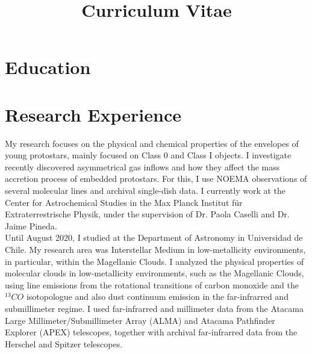 \documentclass[11pt,a4paper,verdana]{moderncv} %
\title{Curriculum Vitae}
\begin{document}
\makecvtitle %

\section{Education}

\section{Research Experience}

My research focuses on the physical and chemical properties of the envelopes of young protostars, mainly focused on Class 0 and Class I objects. I investigate recently discovered asymmetrical gas inflows and how they affect the mass accretion process of embedded protostars. For this, I use NOEMA observations of several molecular lines and archival single-dish data. I currently work at the Center for Astrochemical Studies in the Max Planck Institut f\"{u}r Extraterrestrische Physik, under the supervision of Dr. Paola Caselli and Dr. Jaime Pineda. 
\\
Until August 2020, I studied at the Department of Astronomy in Universidad de Chile. My research area was Interstellar Medium in low-metallicity environments, in particular, within the Magellanic Clouds. I  analyzed the physical properties of molecular clouds in low-metallicity environments, such as the Magellanic Clouds, using line emissions from the rotational transitions of carbon monoxide and the $^{13}CO$ isotopologue and also dust continuum emission in the far-infrarred and submillimeter regime. I used far-infrarred and millimeter data from the Atacama Large Millimeter/Submillimeter Array (ALMA) and Atacama Pathfinder Explorer (APEX) telescopes, together with archival far-infrarred data from the Herschel and Spitzer telescopes.
\end{document}
